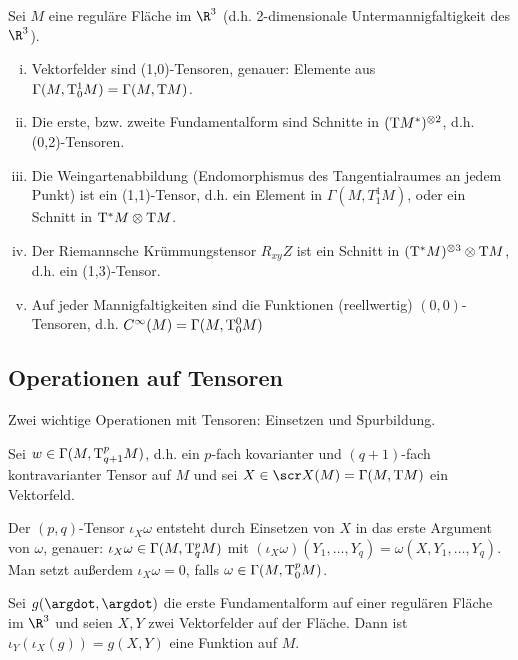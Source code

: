 \begin{ex*}
    Sei $M$ eine reguläre Fläche im $\R^3$ (d.h. 2-dimensionale Untermannigfaltigkeit des $\R^3$).
    \begin{enumerate}[(i)]
        \item
            Vektorfelder sind (1,0)-Tensoren, genauer: Elemente aus $\Gamma(M, \mathrm{T}^1_0 M) = \Gamma(M, \mathrm{T} M)$.
        \item
            Die erste, bzw. zweite Fundamentalform sind Schnitte in $(\mathrm{T} M^*)^{\otimes 2}$, d.h. (0,2)-Tensoren.
        \item
            Die Weingartenabbildung (Endomorphismus des Tangentialraumes an jedem Punkt) ist ein (1,1)-Tensor, d.h. ein Element in $\Gamma(M, T_1^1 M)$, oder ein Schnitt in $\mathrm{T}^* M \otimes \mathrm{T} M$.
        \item
            Der Riemannsche Krümmungstensor $R_{xy} Z$ ist ein Schnitt in $(\mathrm{T}^* M)^{\otimes 3} \otimes \mathrm{T} M$, d.h. ein (1,3)-Tensor.
        \item
            Auf jeder Mannigfaltigkeiten sind die Funktionen (reellwertig) $(0,0)$-Tensoren, d.h. $C^\infty(M) = \Gamma(M, \mathrm{T}_0^0 M)$
    \end{enumerate}
\end{ex*}


\subsection{Operationen auf Tensoren}

Zwei wichtige Operationen mit Tensoren: Einsetzen und Spurbildung.

\begin{df} \label{5.15}
    Sei $w \in \Gamma(M, \mathrm{T}^p_{q+1} M)$, d.h. ein $p$-fach kovarianter und $(q+1)$-fach kontravarianter Tensor auf $M$ und sei $X \in \scr X(M) = \Gamma(M, \T M)$ ein Vektorfeld.

    Der $(p,q)$-Tensor $\iota_X \omega$ entsteht durch Einsetzen von $X$  in das erste Argument von $\omega$, genauer: $\iota_X \omega \in \Gamma(M, \mathrm{T}_q^p M)$ mit
    \begin{math}
        (\iota_X \omega)(Y_1, \dotsc, Y_q) = \omega(X, Y_1, \dotsc, Y_q).
    \end{math}
    Man setzt außerdem $\iota_X \omega = 0$, falls $\omega \in \Gamma(M, \mathrm{T}_0^p M)$.
\end{df}

\begin{ex*}
    Sei $g(\argdot, \argdot)$ die erste Fundamentalform auf einer regulären Fläche im $\R^3$ und seien $X, Y$ zwei Vektorfelder auf der Fläche.
    Dann ist $\iota_Y(\iota_X(g)) = g(X,Y)$ eine Funktion auf $M$.
\end{ex*}

